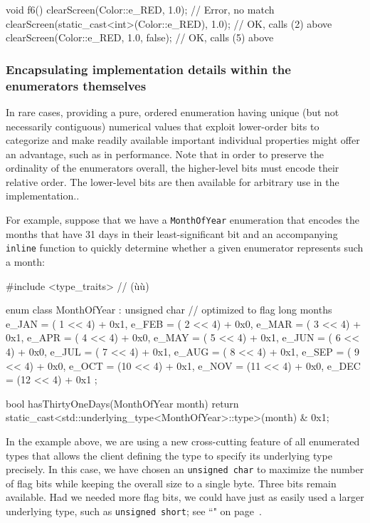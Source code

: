 \begin{emcppslisting}[emcppsbatch=e10]
void f6()
{
    clearScreen(Color::e_RED, 1.0);                   // Error, no match
    clearScreen(static_cast<int>(Color::e_RED), 1.0); // OK, calls (2) above
    clearScreen(Color::e_RED, 1.0, false);            // OK, calls (5) above
}
\end{emcppslisting}


\subsubsection[Encapsulating implementation details within the enumerators themselves]{Encapsulating implementation details within the enumerators themselves}\label{encapsulating-implementation-details-within-the-enumerators-themselves}

In rare cases, providing a pure, ordered enumeration having unique (but
not necessarily contiguous) numerical values that exploit lower-order
bits to categorize and make readily available important
individual properties might offer an advantage, such as in performance. Note that in order to preserve the ordinality of the enumerators
overall, the higher-level bits must encode their relative order. The
lower-level bits are then available for arbitrary use in the
  implementation..

For example, suppose that we have a \texttt{MonthOfYear} enumeration
that encodes the months that have 31 days in their least-significant bit
and an accompanying \texttt{inline} function to quickly determine
whether a given enumerator represents such a month:

\begin{emcppslisting}
#include <type_traits>  // (ù{}ù)

enum class MonthOfYear : unsigned char  // optimized to flag long months
{
    e_JAN = ( 1 << 4) + 0x1,
    e_FEB = ( 2 << 4) + 0x0,
    e_MAR = ( 3 << 4) + 0x1,
    e_APR = ( 4 << 4) + 0x0,
    e_MAY = ( 5 << 4) + 0x1,
    e_JUN = ( 6 << 4) + 0x0,
    e_JUL = ( 7 << 4) + 0x1,
    e_AUG = ( 8 << 4) + 0x1,
    e_SEP = ( 9 << 4) + 0x0,
    e_OCT = (10 << 4) + 0x1,
    e_NOV = (11 << 4) + 0x0,
    e_DEC = (12 << 4) + 0x1
};

bool hasThirtyOneDays(MonthOfYear month)
{
    return static_cast<std::underlying_type<MonthOfYear>::type>(month) & 0x1;
}
\end{emcppslisting}

\noindent In the example above, we are using a new cross-cutting
feature of all enumerated types that allows the client defining the
type to specify its underlying type precisely. In this case, we have
chosen an \texttt{unsigned}~\texttt{char} to maximize the number of
flag bits while keeping the overall size to a single byte. Three bits
remain available. Had we needed more flag bits, we could have just as
easily used a larger underlying type, such as
  \texttt{unsigned}~\texttt{short}; see ``" on page~\pageref{explicit-enumeration-underlying-type}.


